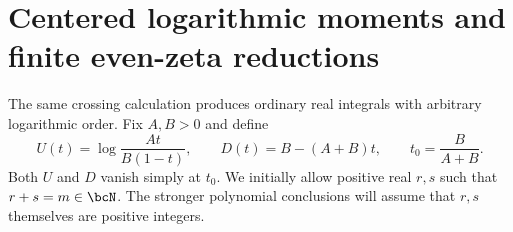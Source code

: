 \section{Centered logarithmic moments and finite even-zeta reductions}
\label{bc:sec:moments}

The same crossing calculation produces ordinary real integrals with
arbitrary logarithmic order. Fix $A,B>0$ and define
\begin{equation}\label{bc:eq:centered-data}
 U(t)=\log\frac{At}{B(1-t)},\qquad
 D(t)=B-(A+B)t,\qquad t_0=\frac{B}{A+B}.
\end{equation}
Both $U$ and $D$ vanish simply at $t_0$. We initially allow positive real
$r,s$ such that $r+s=m\in\bcN$. The stronger polynomial conclusions will
assume that $r,s$ themselves are positive integers.

